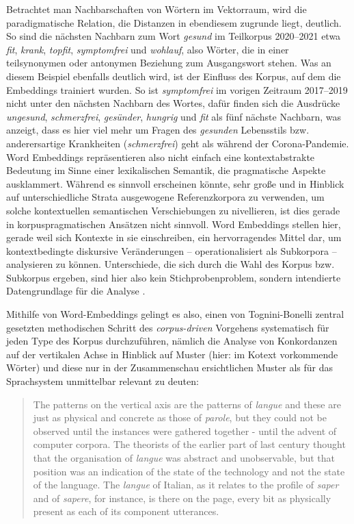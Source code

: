 Betrachtet man Nachbarschaften von Wörtern im Vektorraum, wird die paradigmatische Relation, die Distanzen in ebendiesem zugrunde liegt, deutlich. So sind die nächsten Nachbarn zum Wort \emph{gesund} im Teilkorpus 2020--2021 etwa \emph{fit}, \emph{krank}, \emph{topfit}, \emph{symptomfrei} und \emph{wohlauf}, also Wörter, die in einer teilsynonymen oder antonymen Beziehung zum Ausgangswort stehen. Was an diesem Beispiel ebenfalls deutlich wird, ist der Einfluss des Korpus, auf dem die Embeddings trainiert wurden. So ist \emph{symptomfrei} im vorigen Zeitraum 2017--2019 nicht unter den nächsten Nachbarn des Wortes, dafür finden sich die Ausdrücke \emph{ungesund}, \emph{schmerzfrei}, \emph{gesünder}, \emph{hungrig} und \emph{fit} als fünf nächste Nachbarn, was anzeigt, dass es hier viel mehr um Fragen des \emph{gesunden} Lebensstils bzw. anderersartige Krankheiten (\emph{schmerzfrei}) geht als während der Corona-Pandemie. Word Embeddings repräsentieren also nicht einfach eine kontextabstrakte Bedeutung im Sinne einer lexikalischen Semantik, die pragmatische Aspekte ausklammert. Während es sinnvoll erscheinen könnte, sehr große und in Hinblick auf unterschiedliche Strata ausgewogene Referenzkorpora zu verwenden, um solche kontextuellen semantischen Verschiebungen zu nivellieren, ist dies gerade in korpuspragmatischen Ansätzen nicht sinnvoll. Word Embeddings stellen hier, gerade weil sich Kontexte in sie einschreiben, ein hervorragendes Mittel dar, um kontextbedingte diskursive Veränderungen -- operationalisiert als Subkorpora -- analysieren zu können. Unterschiede, die sich durch die Wahl des Korpus bzw. Subkorpus ergeben, sind hier also kein Stichprobenproblem, sondern intendierte Datengrundlage für die Analyse \autocite[siehe auch][217-218]{knuchelMachineLearningUnd2023}.

Mithilfe von Word-Embeddings gelingt es also, einen von Tognini-Bonelli zentral gesetzten methodischen Schritt des \emph{corpus-driven} Vorgehens systematisch für jeden Type des Korpus durchzuführen, nämlich die Analyse von Konkordanzen auf der vertikalen Achse in Hinblick auf Muster (hier: im Kotext vorkommende Wörter) und diese nur in der Zusammenschau ersichtlichen Muster als für das Sprachsystem unmittelbar relevant zu deuten:

\begin{quote}
The patterns on the vertical axis are the patterns of \emph{langue} and these are just as physical and concrete as those of \emph{parole}, but they could not be observed until the instances were gathered together - until the advent of computer corpora. The theorists of the earlier part of last century thought that the organisation of \emph{langue} was abstract and unobservable, but that position was an indication of the state of the technology and not the state of the language. The \emph{langue} of Italian, as it relates to the profile of \emph{saper} and of \emph{sapere}, for instance, is there on the page, every bit as physically present as each of its component utterances. \autocite[98-99]{tognini-bonelliCorpusLinguisticsWork2001}
\end{quote}

